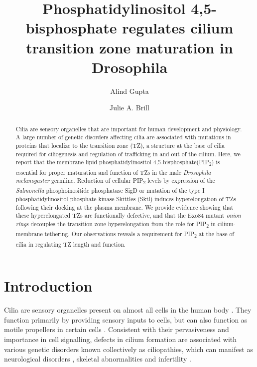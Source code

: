 \documentclass[12pt, twoside, letterpaper]{article}
\title{\bfseries\large Phosphatidylinositol 4,5-bisphosphate regulates cilium transition zone maturation in Drosophila}
\author[1,2]{Alind Gupta}
\author[1,2]{Julie A. Brill}
\affil[1]{Department of Molecular Genetics, University of Toronto, Toronto, ON M5S 1A8, Canada}
\affil[2]{Program in Cell Biology, Hospital for Sick Children, Toronto, ON M5G 1X8, Canada}
\date{}
\newcommand{\PIP}{PIP\textsubscript{2}}
\begin{document}
\maketitle
\raggedright
\begin{abstract}
  \vspace*{-0.7em}
  Cilia are sensory organelles that are important for human development
  and physiology.
  A large number of genetic disorders affecting cilia are associated with
  mutations in proteins that localize to the transition zone (TZ),
  a structure at the base of cilia required for ciliogenesis and
  regulation of trafficking in and out of the cilium.
  Here, we report that the membrane lipid phosphatidylinositol
  4,5-bisphosphate(\PIP{}) is essential for proper maturation and function
  of TZs in the male \textit{Drosophila melanogaster} germline.
  Reduction of cellular \PIP{} levels by expression of the
  \textit{Salmonella} phosphoinositide phosphatase SigD or mutation of
  the type I phosphatidylinositol phosphate kinase Skittles (Sktl)
  induces hyperelongation of TZs following their docking at the plasma
  membrane.
  We provide evidence showing that these hyperelongated TZs are functionally
  defective, and that the Exo84 mutant \textit{onion rings} decouples the
  transition zone hyperelongation from the role for \PIP{} in cilium-membrane
  tethering.
  Our observations reveals a requirement for \PIP{} at the base of cilia
  in regulating TZ length and function.
\end{abstract}

\section{Introduction}
Cilia are sensory organelles present on almost all cells in the human body
\citep{satir2010primary}.
They function primarily by providing sensory inputs to cells, but can
also function as motile propellers in certain cells
\citep{bloodgood2010sensory}.
Consistent with their pervasiveness and importance in cell signalling,
defects in cilium formation are associated with various genetic disorders
known collectively as ciliopathies, which can manifest as
neurological disorders \citep{valente2014primary},
skeletal abnormalities \citep{hammarsjo2017novel, waters2011ciliopathies}
and infertility \citep{inaba2016sperm}.
\end{document}

